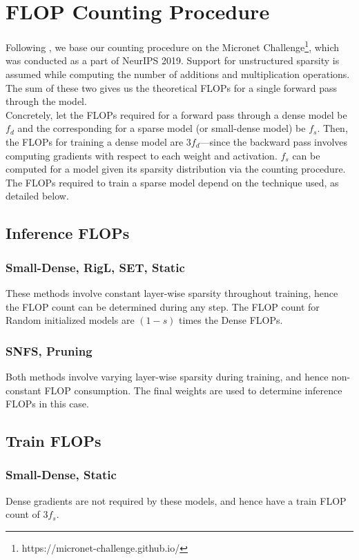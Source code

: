 \section{FLOP Counting Procedure}

Following \citet{rigl}, we base our counting procedure on the Micronet Challenge\footnote{https://micronet-challenge.github.io/}, which was conducted as a part of NeurIPS 2019. Support for unstructured sparsity is assumed while computing the number of additions and multiplication operations. The sum of these two gives us the theoretical FLOPs for a single forward pass through the model. \\

Concretely, let the FLOPs required for a forward pass through a dense model be $f_d$ and the corresponding for a sparse model (or small-dense model) be $f_s$. Then, the FLOPs for training a dense model are $3f_d$---since the backward pass involves computing gradients with respect to each weight and activation. $f_s$ can be computed for a model given its sparsity distribution via the counting procedure. The FLOPs required to train a sparse model depend on the technique used, as detailed below.

\subsection{Inference FLOPs}

\subsubsection{Small-Dense, RigL, SET, Static} These methods involve constant layer-wise sparsity throughout training, hence the FLOP count can be determined during any step. The FLOP count for Random initialized models are $(1-s)$ times the Dense FLOPs.

\subsubsection{SNFS, Pruning} Both methods involve varying layer-wise sparsity during training, and hence non-constant FLOP consumption. The final weights are used to determine inference FLOPs in this case.

\subsection{Train FLOPs}

\subsubsection{Small-Dense, Static} Dense gradients are not required by these models, and hence have a train FLOP count of $3f_s$.

